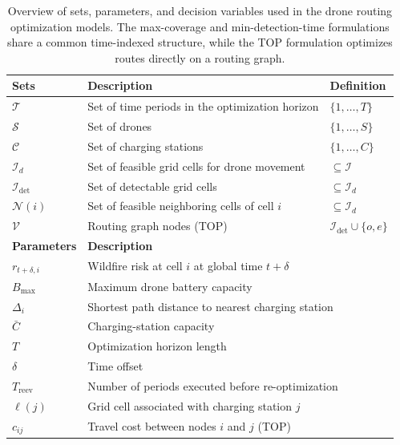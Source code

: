 \documentclass[pdflatex,sn-mathphys-num]{sn-jnl}%
\theoremstyle{thmstyleone}%
\theoremstyle{thmstyletwo}%
\theoremstyle{thmstylethree}%
\begin{document}
\begin{table}[htbp]
\centering
\small
\caption{Overview of sets, parameters, and decision variables used in the drone routing optimization models. The max-coverage and min-detection-time formulations share a common time-indexed structure, while the TOP formulation optimizes routes directly on a routing graph.}
\label{tab:routing_overview}
\begin{tabular}{lll}
\toprule
\textbf{Sets} & \textbf{Description} & \textbf{Definition} \\
\midrule
$\mathcal T$ & Set of time periods in the optimization horizon & $\{1,\dots,T\}$ \\
$\mathcal S$ & Set of drones & $\{1,\dots,S\}$ \\
$\mathcal C$ & Set of charging stations & $\{1,\dots,C\}$ \\
$\mathcal I_d$ & Set of feasible grid cells for drone movement & $\subseteq \mathcal I$ \\
$\mathcal I_{\mathrm{det}}$ & Set of detectable grid cells & $\subseteq \mathcal I_d$ \\
$\mathcal N(i)$ & Set of feasible neighboring cells of cell $i$ & $\subseteq \mathcal I_d$ \\
$\mathcal V$ & Routing graph nodes (TOP) & $\mathcal I_{\mathrm{det}} \cup \{o,e\}$ \\
\midrule
\textbf{Parameters} & \multicolumn{2}{l}{\textbf{Description}} \\
\midrule
$r_{t+\delta,i}$ & \multicolumn{2}{l}{Wildfire risk at cell $i$ at global time $t+\delta$} \\
$B_{\max}$ & \multicolumn{2}{l}{Maximum drone battery capacity} \\
$\Delta_i$ & \multicolumn{2}{l}{Shortest path distance to nearest charging station} \\
$\bar C$ & \multicolumn{2}{l}{Charging-station capacity} \\
$T$ & \multicolumn{2}{l}{Optimization horizon length} \\
$\delta$ & \multicolumn{2}{l}{Time offset} \\
$T_{\mathrm{reev}}$ & \multicolumn{2}{l}{Number of periods executed before re-optimization} \\
$\ell(j)$ & \multicolumn{2}{l}{Grid cell associated with charging station $j$} \\
$c_{ij}$ & \multicolumn{2}{l}{Travel cost between nodes $i$ and $j$ (TOP)} \\

\end{tabular}
\end{table}
\end{document}
